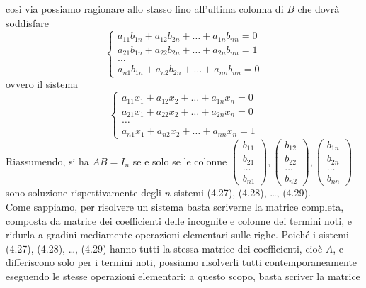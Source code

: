 così via possiamo ragionare allo stasso fino all'ultima colonna di $B$ che dovrà soddisfare
\begin{equation*}
  \begin{cases}
    a_{11}b_{1n} + a_{12}b_{2n}+\dots +a_{1n}b_{nn} =0\\
    a_{21}b_{1n} + a_{22}b_{2n}+\dots +a_{2n}b_{nn} =1\\
    \dots\\
    a_{n1}b_{1n} + a_{n2}b_{2n}+\dots +a_{nn}b_{nn} =0
  \end{cases}
\end{equation*}
ovvero il sistema
\begin{equation}
   \begin{cases}
    a_{11}x_1 + a_{12}x_2+\dots +a_{1n}x_n =0\\
    a_{21}x_1 + a_{22}x_2+\dots +a_{2n}x_n =0\\
    \dots\\
    a_{n1}x_1 + a_{n2}x_2+\dots +a_{nn}x_n =1
  \end{cases}
\end{equation}
Riassumendo, si ha $AB=I_n$ se e solo se le colonne $
\begin{pmatrix}
  b_{11}\\
  b_{21}\\
  \dots\\
  b_{n1}
\end{pmatrix},
\begin{pmatrix}
  b_{12}\\
  b_{22}\\
  \dots\\
  b_{n2}
\end{pmatrix},
\begin{pmatrix}
  b_{1n}\\
  b_{2n}\\
  \dots\\
  b_{nn}
\end{pmatrix}
$ sono soluzione rispettivamente degli $n$ sistemi (4.27), (4.28), \dots, (4.29).\\
Come sappiamo, per risolvere un sistema basta scriverne la matrice completa, composta da matrice dei
coefficienti delle incognite e colonne dei termini noti, e ridurla a gradini mediamente operazioni elementari
sulle righe. Poiché i sistemi (4.27), (4.28), \dots, (4.29) hanno tutti la stessa matrice dei coefficienti, cioè
$A$, e differiscono solo per i termini noti, possiamo risolverli tutti contemporaneamente eseguendo le stesse
operazioni elementari: a questo scopo, basta scriver la matrice
